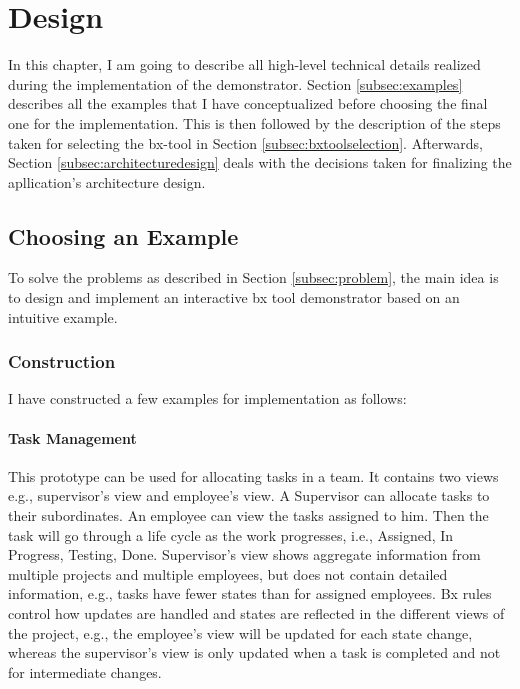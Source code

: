 \section{Design}\label{sec:design}
In this chapter, I am going to describe all high-level technical details realized during the implementation of the demonstrator. Section \ref{subsec:examples} describes all the examples that I have conceptualized before choosing the final one for the implementation. This is then followed by the description of the steps taken for selecting the bx-tool in Section \ref{subsec:bxtoolselection}. Afterwards, Section \ref{subsec:architecturedesign} deals with the decisions taken for finalizing the apllication's architecture design.
\subsection{Choosing an Example}\label{subsec:exampleforimplementation}
To solve the problems as described in Section \ref{subsec:problem}, the main idea is to design and implement an interactive bx tool demonstrator based on an intuitive example.
\subsubsection{Construction}\label{subsubsec:exampleconstruction}
I have constructed a few examples for implementation as follows:
\paragraph{Task Management} This prototype can be used for allocating tasks in a team. It contains two views e.g., supervisor's view and employee's view. A Supervisor can allocate tasks to their subordinates. An employee can view the tasks assigned to him. Then the task will go through a life cycle as the work progresses, i.e., Assigned, In Progress, Testing, Done. Supervisor's view shows aggregate information from multiple projects and multiple employees, but does not contain detailed information, e.g., tasks have fewer states than for assigned employees. Bx rules control how updates are handled and states are reflected in the different views of the project, e.g., the employee's view will be updated for each state change, whereas the supervisor's view is only updated when a task is completed and not for intermediate changes.


